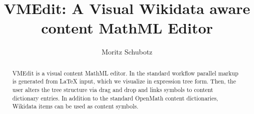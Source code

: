 \documentclass{llncs}
\begin{document}
\title{VMEdit: A Visual Wikidata aware content MathML Editor}

\author{
   Moritz Schubotz
}


\maketitle

\begin{abstract}
VMEdit is a visual content MathML editor.
In the standard workflow parallel markup is generated from LaTeX input, which we visualize in expression tree form.
Then, the user alters the tree structure via drag and drop and links symbols to content dictionary entries.
In addition to the standard OpenMath content dictionaries, Wikidata items can be used as content symbols.
\end{abstract}
\end{document}
